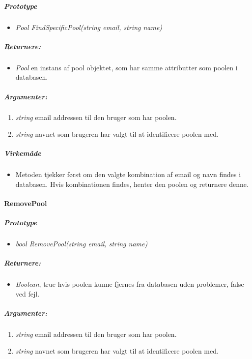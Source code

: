 \subparagraph{Prototype}
\begin{itemize}
	\item \textit{Pool FindSpecificPool(string email, string name)}
\end{itemize}

\subparagraph{Returnere:}
\begin{itemize}
	\item \textit{Pool} en instans af pool objektet, som har samme attributter som poolen i databasen.
\end{itemize}

\subparagraph{Argumenter:}
\begin{enumerate}
	\item \textit{string} email addressen til den bruger som har poolen.
	\item \textit{string} navnet som brugeren har valgt til at identificere poolen med.
\end{enumerate}

\subparagraph{Virkemåde}
\begin{itemize}
	\item Metoden tjekker først om den valgte kombination af email og navn findes i databasen. Hvis kombinationen findes, henter den poolen og returnere denne.
\end{itemize}








\paragraph{RemovePool}%

\subparagraph{Prototype}
\begin{itemize}
	\item \textit{bool RemovePool(string email, string name)}
\end{itemize}

\subparagraph{Returnere:}
\begin{itemize}
	\item \textit{Boolean}, true hvis poolen kunne fjernes fra databasen uden problemer, false ved fejl.
\end{itemize}

\subparagraph{Argumenter:}
\begin{enumerate}
	\item \textit{string} email addressen til den bruger som har poolen.
	\item \textit{string} navnet som brugeren har valgt til at identificere poolen med.
\end{enumerate}

